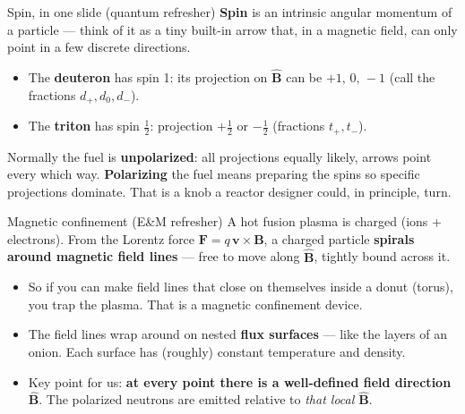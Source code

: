 \documentclass[11pt,aspectratio=169]{beamer}
\newcommand{\key}[1]{\textcolor{key}{\textbf{#1}}}
\newcommand{\bhat}{\hat{\mathbf{B}}}
\begin{document}
\begin{frame}{Spin, in one slide (quantum refresher)}
\key{Spin} is an intrinsic angular momentum of a particle --- think of it as a tiny built-in
arrow that, in a magnetic field, can only point in a few discrete directions.
\begin{itemize}
\item The \key{deuteron} has spin 1: its projection on $\bhat$ can be $+1,\,0,\,-1$
(call the fractions $d_+,d_0,d_-$).
\item The \key{triton} has spin $\tfrac12$: projection $+\tfrac12$ or $-\tfrac12$
(fractions $t_+,t_-$).
\end{itemize}
Normally the fuel is \key{unpolarized}: all projections equally likely, arrows point every
which way. \key{Polarizing} the fuel means preparing the spins so specific projections
dominate. That is a knob a reactor designer could, in principle, turn.
\end{frame}

\begin{frame}{Magnetic confinement (E\&M refresher)}
A hot fusion plasma is charged (ions + electrons). From the Lorentz force
$\mathbf{F}=q\,\mathbf{v}\times\mathbf{B}$, a charged particle \key{spirals around magnetic
field lines} --- free to move along $\bhat$, tightly bound across it.
\begin{itemize}
\item So if you can make field lines that close on themselves inside a donut (torus), you
trap the plasma. That is a magnetic confinement device.
\item The field lines wrap around on nested \key{flux surfaces} --- like the layers of an
onion. Each surface has (roughly) constant temperature and density.
\item Key point for us: \key{at every point there is a well-defined field direction $\bhat$}.
The polarized neutrons are emitted relative to \emph{that local $\bhat$}.
\end{itemize}
\end{frame}
\end{document}
